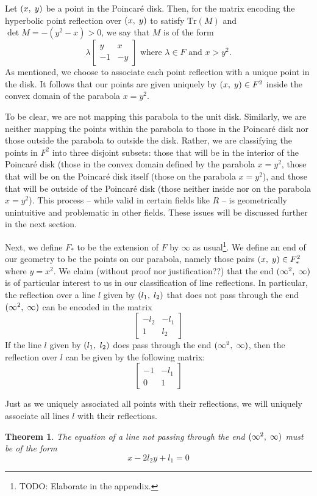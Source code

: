 \documentclass[12pt]{article}
\newcommand{\poincare}{Poincar\'{e} }
\newcommand{\Tr}{\text{Tr}}
\newcommand{\ttc}{, \hspace{1mm}}
\newcommand{\lftmat}[4]{\begin{bmatrix} {#1} & {#2} \\ {#3} & {#4} \end{bmatrix}}
\newcommand{\pointmat}[2]{\lftmat{{#2}}{{#1}}{-1}{-{#2}}}
\newcommand{\stanpointmat}{\pointmat{x}{y}}
\newcommand{\linenoendmat}[2]{\begin{bmatrix} -{#2} & -{#1} \\ 1 & {#2} \end{bmatrix}}
\newcommand{\stanlinenoendmat}{\linenoendmat{l_1}{l_2}}
\newcommand{\lineendmat}[2]{\begin{bmatrix} -1 & -{#1} \\ 0 & 1 \end{bmatrix}}
\newcommand{\stanlineendmat}{\lineendmat{l_1}{l_2}}
\newcommand{\specialend}{(\infty^2\ttc\infty)}
\theoremstyle{plain}
\newtheorem{theorem}{Theorem}[section]
\theoremstyle{definition}
\begin{document}
Let $(x \ttc y)$ be a point in the \poincare disk. Then, for the matrix encoding the hyperbolic point reflection over $(x \ttc y)$ to satisfy $\Tr(M)$ and $\det M = -(y^2 - x) > 0$, we say that $M$ is of the form
\begin{equation} 
	\lambda \stanpointmat \text{ where } \lambda \in F \text{ and } x > y^2. 
\end{equation}	
As mentioned, we choose to associate each point reflection with a unique point in the disk. It follows that our points are given uniquely by $(x \ttc y) \in F^2$ inside the convex domain of the parabola $x = y^2$.

To be clear, we are not mapping this parabola to the unit disk. Similarly, we are neither mapping the points within the parabola to those in the \poincare disk nor those outside the parabola to outside the disk. Rather, we are classifying the points in $F^2$ into three disjoint subsets: those that will be in the interior of the \poincare disk (those in the convex domain defined by the parabola $x = y^2$, those that will be on the \poincare disk itself (those on the parabola $x = y^2$), and those that will be outside of the \poincare disk (those neither inside nor on the parabola $x = y^2$). This process -- while valid in certain fields like $R$ -- is geometrically unintuitive and problematic in other fields. These issues will be discussed further in the next section. 

Next, we define $F_*$ to be the extension of $F$ by $\infty$ as usual\footnote{TODO: Elaborate in the appendix.}. We define an end of our geometry to be the points on our parabola, namely those pairs $(x \ttc y) \in F_*^2$ where $y = x^2$. We claim (without proof nor justification??) that the end $\specialend$ is of particular interest to us in our classification of line reflections. In particular, the reflection over a line $l$ given by $(l_1\ttc l_2)$ that does not pass through the end $\specialend$ can be encoded in the matrix
\[\stanlinenoendmat\]
If the line $l$ given by $(l_1\ttc l_2)$ does pass through the end $\specialend$, then the reflection over $l$ can be given by the following matrix:
\[
	\stanlineendmat
\]

Just as we uniquely associated all points with their reflections, we will uniquely associate all lines $l$ with their reflections.


\begin{theorem}The equation of a line not passing through the end $\specialend$ must be of the form \begin{equation}
	x - 2l_2y + l_1  = 0
\end{equation} 
\end{theorem}
\end{document}
